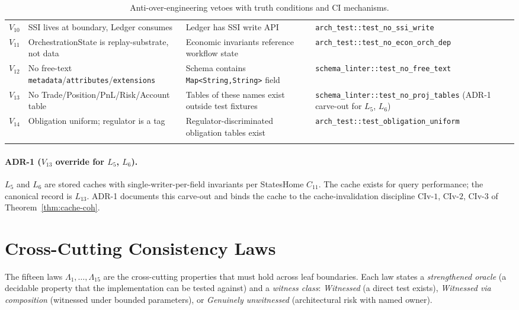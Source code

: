 \documentclass[11pt,a4paper]{article}
\begin{document}
\begin{center}
\begin{longtable}{@{}p{0.8cm}p{4.6cm}p{5.5cm}p{4.5cm}@{}}
$V_{10}$ & SSI lives at boundary, Ledger consumes        & Ledger has SSI write API & \texttt{arch\_test::test\_no\_ssi\_write} \\
$V_{11}$ & OrchestrationState is replay-substrate, not data & Economic invariants reference workflow state & \texttt{arch\_test::test\_no\_econ\_orch\_dep} \\
$V_{12}$ & No free-text \texttt{metadata}/\texttt{attributes}/\texttt{extensions} & Schema contains \texttt{Map<String,String>} field & \texttt{schema\_linter::test\_no\_free\_text} \\
$V_{13}$ & No Trade/Position/PnL/Risk/Account table       & Tables of these names exist outside test fixtures & \texttt{schema\_linter::test\_no\_proj\_tables} (ADR-1 carve-out for $L_5$, $L_6$) \\
$V_{14}$ & Obligation uniform; regulator is a tag         & Regulator-discriminated obligation tables exist & \texttt{arch\_test::test\_obligation\_uniform} \\
\caption{Anti-over-engineering vetoes with truth conditions and CI mechanisms.}
\label{tab:vetoes}
\end{longtable}
\end{center}

\paragraph{ADR-1 ($V_{13}$ override for $L_5$, $L_6$).} $L_5$ and $L_6$ are stored caches with single-writer-per-field invariants per StatesHome $C_{11}$. The cache exists for query performance; the canonical record is $L_{13}$. ADR-1 documents this carve-out and binds the cache to the cache-invalidation discipline $\mathrm{CIv}\textrm{-}1$, $\mathrm{CIv}\textrm{-}2$, $\mathrm{CIv}\textrm{-}3$ of Theorem~\ref{thm:cache-coh}.

\clearpage
\section{Cross-Cutting Consistency Laws}
\label{sec:laws}

The fifteen laws $\Lambda_1, \dots, \Lambda_{15}$ are the cross-cutting properties that must hold across leaf boundaries. Each law states a \emph{strengthened oracle} (a decidable property that the implementation can be tested against) and a \emph{witness class}: \emph{Witnessed} (a direct test exists), \emph{Witnessed via composition} (witnessed under bounded parameters), or \emph{Genuinely unwitnessed} (architectural risk with named owner).
\end{document}

